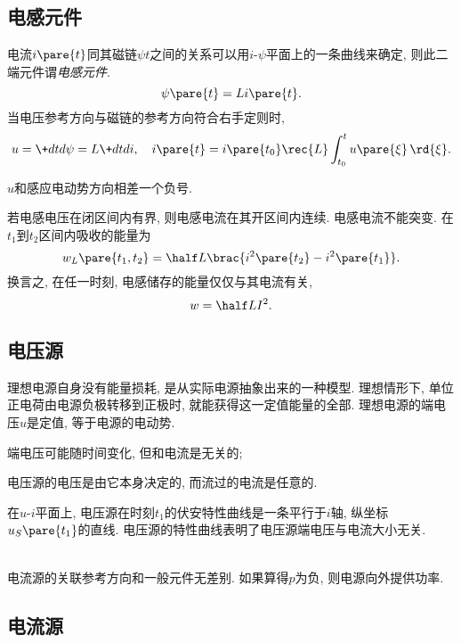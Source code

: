 \documentclass{ctexart}
\begin{document}

\subsection{电感元件} %
\label{sub:电感元件}

电流$i\pare{t}$同其磁链$\psi{t}$之间的关系可以用$i$-$\psi$平面上的一条曲线来确定, 则此二端元件谓\emph{电感元件}.
\[ \psi\pare{t} = Li\pare{t}. \]
当电压参考方向与磁链的参考方向符合右手定则时,
\[ u = \+dtd\psi = L\+dtdi,\quad i\pare{t} = i\pare{t_0} \rec{L}\int_{t_0}^t u\pare{\xi}\,\rd{\xi}. \]
\begin{remark}
    $u$和感应电动势方向相差一个负号.
\end{remark}
若电感电压在闭区间内有界, 则电感电流在其开区间内连续. {\color{red}电感电流不能突变.}
在$t_1$到$t_2$区间内吸收的能量为
\[ w_L\pare{t_1,t_2} = \half L\brac{i^2\pare{t_2} - i^2\pare{t_1}}. \]
换言之, 在任一时刻, 电感储存的能量仅仅与其电流有关,
\[ w = \half LI^2. \]


\subsection{电压源} %
\label{sub:电压源}

理想电源自身没有能量损耗, 是从实际电源抽象出来的一种模型. 理想情形下, 单位正电荷由电源负极转移到正极时, 就能获得这一定值能量的全部. {\color{red}理想电源的端电压$u$是定值, 等于电源的电动势.}
\begin{cenum}
    \item 端电压可能随时间变化, 但和电流是无关的;
    \item 电压源的电压是由它本身决定的, 而流过的电流是任意的.
\end{cenum}
在$u$-$i$平面上, 电压源在时刻$t_1$的伏安特性曲线是一条平行于$i$轴, 纵坐标$u_S\pare{t_1}$的直线. 电压源的特性曲线表明了电压源端电压与电流大小无关.\\
\\
\begin{remark}
    电流源的关联参考方向和一般元件无差别. 如果算得$p$为负, 则电源向外提供功率.
\end{remark}


\subsection{电流源} %
\label{sub:电流源}
\end{document}
